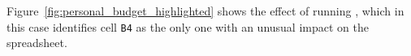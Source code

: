 Figure~\ref{fig:personal_budget_highlighted} shows the effect of
running \checkcell{}, which in this case identifies cell \texttt{B4}
as the only one with an unusual impact on the spreadsheet.




